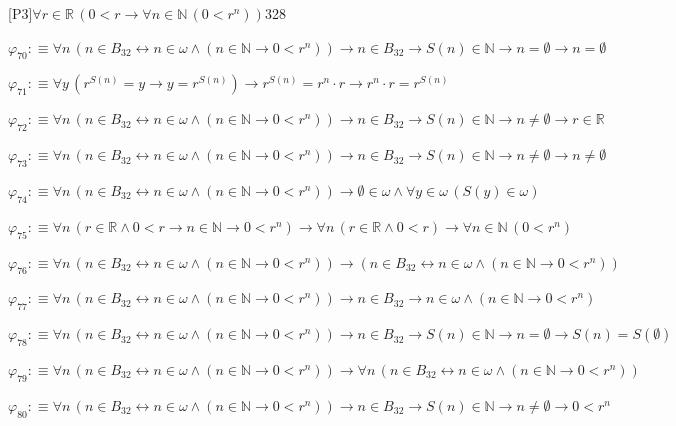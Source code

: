 \begin{fullproof}{[P3]}{$\forall r \in \mathbb{R}\,(0 < r \to \forall n \in \mathbb{N}\,(0 < {{r}^{n}}))$}{328}
\begin{abbrevlist}
\item $\varphi_{70} :\equiv \forall n\,(n \in B_{32} \leftrightarrow n \in \omega \land (n \in \mathbb{N} \to 0 < {{r}^{n}})) \to n \in B_{32} \to S(n) \in \mathbb{N} \to n = \emptyset \to n = \emptyset$
\item $\varphi_{71} :\equiv \forall y\,({{r}^{S(n)}} = y \to y = {{r}^{S(n)}}) \to {{r}^{S(n)}} = {{r}^{n}} \cdot r \to {{r}^{n}} \cdot r = {{r}^{S(n)}}$
\item $\varphi_{72} :\equiv \forall n\,(n \in B_{32} \leftrightarrow n \in \omega \land (n \in \mathbb{N} \to 0 < {{r}^{n}})) \to n \in B_{32} \to S(n) \in \mathbb{N} \to n \neq \emptyset \to r \in \mathbb{R}$
\item $\varphi_{73} :\equiv \forall n\,(n \in B_{32} \leftrightarrow n \in \omega \land (n \in \mathbb{N} \to 0 < {{r}^{n}})) \to n \in B_{32} \to S(n) \in \mathbb{N} \to n \neq \emptyset \to n \neq \emptyset$
\item $\varphi_{74} :\equiv \forall n\,(n \in B_{32} \leftrightarrow n \in \omega \land (n \in \mathbb{N} \to 0 < {{r}^{n}})) \to \emptyset \in \omega \land \forall y \in \omega\,(S(y) \in \omega)$
\item $\varphi_{75} :\equiv \forall n\,(r \in \mathbb{R} \land 0 < r \to n \in \mathbb{N} \to 0 < {{r}^{n}}) \to \forall n\,(r \in \mathbb{R} \land 0 < r) \to \forall n \in \mathbb{N}\,(0 < {{r}^{n}})$
\item $\varphi_{76} :\equiv \forall n\,(n \in B_{32} \leftrightarrow n \in \omega \land (n \in \mathbb{N} \to 0 < {{r}^{n}})) \to (n \in B_{32} \leftrightarrow n \in \omega \land (n \in \mathbb{N} \to 0 < {{r}^{n}}))$
\item $\varphi_{77} :\equiv \forall n\,(n \in B_{32} \leftrightarrow n \in \omega \land (n \in \mathbb{N} \to 0 < {{r}^{n}})) \to n \in B_{32} \to n \in \omega \land (n \in \mathbb{N} \to 0 < {{r}^{n}})$
\item $\varphi_{78} :\equiv \forall n\,(n \in B_{32} \leftrightarrow n \in \omega \land (n \in \mathbb{N} \to 0 < {{r}^{n}})) \to n \in B_{32} \to S(n) \in \mathbb{N} \to n = \emptyset \to S(n) = S(\emptyset)$
\item $\varphi_{79} :\equiv \forall n\,(n \in B_{32} \leftrightarrow n \in \omega \land (n \in \mathbb{N} \to 0 < {{r}^{n}})) \to \forall n\,(n \in B_{32} \leftrightarrow n \in \omega \land (n \in \mathbb{N} \to 0 < {{r}^{n}}))$
\item $\varphi_{80} :\equiv \forall n\,(n \in B_{32} \leftrightarrow n \in \omega \land (n \in \mathbb{N} \to 0 < {{r}^{n}})) \to n \in B_{32} \to S(n) \in \mathbb{N} \to n \neq \emptyset \to 0 < {{r}^{n}}$

\end{abbrevlist}
\end{fullproof}
